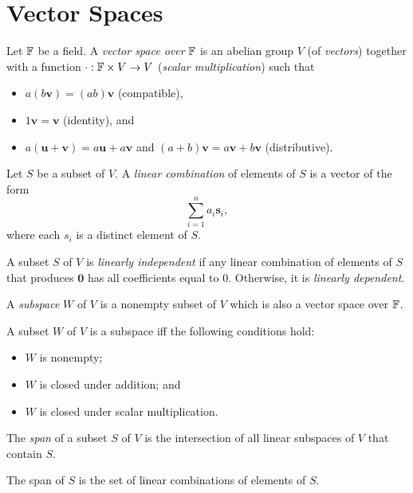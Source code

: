 \chapter{Vector Spaces}
\begin{defn}
  Let $\mathbb{F}$ be a field. A \emph{vector space over} $\mathbb{F}$ is an abelian group
  $V$ (of \emph{vectors})
  together with a function $\cdot:\mathbb{F}\times V\to V$ (\emph{scalar
    multiplication}) such that
  \begin{itemize}
    \item $a(b\mathbf v)=(ab)\mathbf v$ (compatible),
    \item $1\mathbf v=\mathbf v$ (identity), and
    \item $a(\mathbf u+\mathbf v)=a\mathbf u+a\mathbf v$ and $(a+b)\mathbf
      v=a\mathbf v+b\mathbf v$ (distributive).
  \end{itemize}
\end{defn}
\begin{defn}
  Let $S$ be a subset of $V$. A \emph{linear combination} of elements of $S$ is
  a vector of the form \[\sum_{i=1}^n a_i\mathbf s_i,\] where each $s_i$ is a
  distinct element of $S$.
\end{defn}
\begin{defn}
  A subset $S$ of $V$ is \emph{linearly independent} if any linear combination
  of elements of $S$ that produces $\mathbf 0$ has all coefficients equal to $0$.
  Otherwise, it is \emph{linearly dependent}.
\end{defn}
\begin{defn}
  A \emph{subspace} $W$ of $V$ is a nonempty subset of $V$ which is also a
  vector space over $\mathbb{F}$.
\end{defn}
\begin{prop}
  A subset $W$ of $V$ is a subspace iff the following conditions hold:
  \begin{itemize}
    \item $W$ is nonempty;
    \item $W$ is closed under addition; and
    \item $W$ is closed under scalar multiplication.
  \end{itemize}
\end{prop}
\begin{defn}
  The \emph{span} of a subset $S$ of $V$ is the intersection of all linear
  subspaces of $V$ that contain $S$.  
\end{defn}
\begin{prop}
  The span of $S$ is the set of linear combinations of elements of $S$.
\end{prop}
